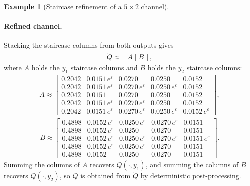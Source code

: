 \documentclass{article}
\theoremstyle{plain}
\theoremstyle{definition}
\newtheorem{example}[theorem]{Example}
\theoremstyle{plain}
\newcommand{\eps}{\varepsilon}
\begin{document}
\begin{example}[Staircase refinement of a $5\times 2$ channel]
\paragraph{Refined channel.}
Stacking the staircase columns from both outputs gives
\begin{align*}
    \widetilde Q \approx [\,A \mid B\,],
\end{align*}
where $A$ holds the $y_1$ staircase columns and $B$ holds the $y_2$ staircase columns:
\begin{align*}
    A \approx
    \begin{bmatrix}
    0.2042 & 0.0151\,e^\eps & 0.0270 & 0.0250 & 0.0152 \\
    0.2042 & 0.0151\,e^\eps & 0.0270\,e^\eps & 0.0250\,e^\eps & 0.0152 \\
    0.2042 & 0.0151 & 0.0270 & 0.0250 & 0.0152 \\
    0.2042 & 0.0151\,e^\eps & 0.0270\,e^\eps & 0.0250 & 0.0152 \\
    0.2042 & 0.0151\,e^\eps & 0.0270\,e^\eps & 0.0250\,e^\eps & 0.0152\,e^\eps
    \end{bmatrix},
\end{align*}
\begin{align*}
    B \approx
    \begin{bmatrix}
    0.4898 & 0.0152\,e^\eps & 0.0250\,e^\eps & 0.0270\,e^\eps & 0.0151 \\
    0.4898 & 0.0152\,e^\eps & 0.0250 & 0.0270 & 0.0151 \\
    0.4898 & 0.0152\,e^\eps & 0.0250\,e^\eps & 0.0270\,e^\eps & 0.0151\,e^\eps \\
    0.4898 & 0.0152\,e^\eps & 0.0250\,e^\eps & 0.0270 & 0.0151 \\
    0.4898 & 0.0152 & 0.0250 & 0.0270 & 0.0151
    \end{bmatrix}.
\end{align*}
Summing the columns of $A$ recovers $Q(\cdot,y_1)$, and summing the columns of $B$ recovers $Q(\cdot,y_2)$, so $Q$ is obtained from $\widetilde{Q}$ by deterministic post-processing.
\end{example}
\end{document}
